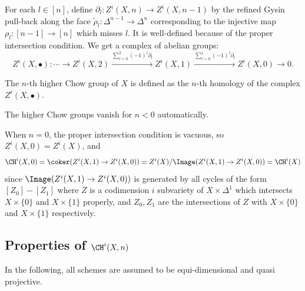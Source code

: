   For each $l \in [n]$, define $\partial_l: Z^i(X,n) \to Z^i(X,n-1)$ by the refined Gysin pull-back along the face $\tilde{\rho}_l: \Delta^{n-1} \to \Delta^n$ corresponding to the injective map $\rho_l: [n-1] \to [n]$ which misses $l$.
  It is well-defined because of the proper intersection condition.
  We get a complex of abelian groups:
  \[ Z^i(X,\bullet): \cdots \to Z^i(X,2) \xrightarrow{\sum_{l=0}^2 (-1)^l \partial_l} Z^i(X,1) \xrightarrow{ \sum_{l=0}^1 (-1)^l \partial_l} Z^i(X,0) \to 0. \]

  \begin{definition}
    The $n$-th higher Chow group of $X$ is defined as the $n$-th homology of the complex $Z^i(X,\bullet)$.
  \end{definition}

  The higher Chow groups vanish for $n<0$ automatically.

  \begin{example}
    When $n=0$, the proper intersection condition is vacuous, so $Z^i(X,0) = Z^i(X)$, and 
    \[ \CH^i(X,0) = \coker(Z^i(X,1) \to Z^i(X,0)) = Z^i(X)/\Image(Z^i(X,1) \to Z^i(X,0)) = \CH^i(X) \]
    since $\Image(Z^i(X,1) \to Z^i(X,0))$ is generated by all cycles of the form $[Z_0] - [Z_1]$ where $Z$ is a codimension $i$ subvariety of $X\times \Delta^1$ which intersects $X\times \{0\}$ and $X\times \{1\}$ properly, and $Z_0,Z_1$ are the intersections of $Z$ with $X\times \{0\}$ and $X\times \{1\}$ respectively.
  \end{example}


\subsection[Properties of higher Chow groups]{Properties of $\CH^i(X,n)$}

  In the following, all schemes are assumed to be equi-dimensional and quasi projective.


